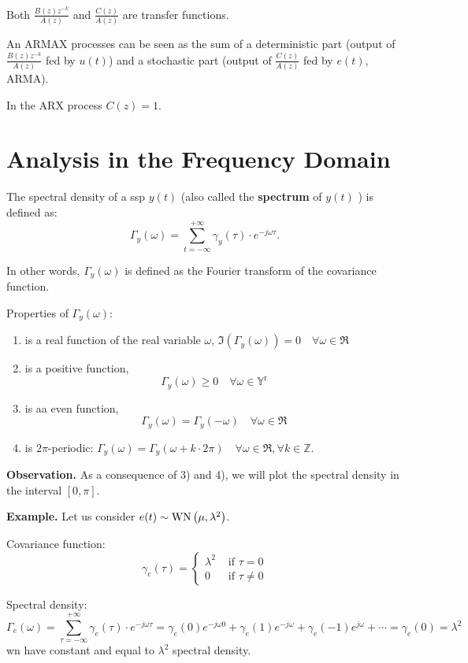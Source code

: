 Both $\frac{B(z) z^{-k}}{A(z)}$ and $\frac{C(z)}{A(z)}$ are transfer functions.

An ARMAX processes can be seen as the sum of a deterministic part (output of $\frac{B(z) z^{-k}}{A(z)}$ fed by $u(t)$) and a stochastic part (output of $\frac{C(z)}{A(z)}$ fed by $e(t)$, ARMA).

In the ARX process $C(z)=1$.

\section{Analysis in the Frequency Domain}
\begin{definition}
	The spectral density of a \gls{ssp} $y(t)$ (also called the \textbf{spectrum} of $y(t)$ ) is defined as:
	\[
		\Gamma_{y}(\omega)=\sum_{t=-\infty}^{+\infty} \gamma_{y}(\tau) \cdot e^{-j \omega \tau}.
	\]
\end{definition}

In other words, $\Gamma_y(\omega)$ is defined as the Fourier transform of the covariance function.

Properties of $\Gamma_{y}(\omega)$:
\begin{enumerate}
	\item is a real function of the real variable $\omega$, $\Im\left(\Gamma_{y}(\omega)\right)=0 \quad \forall \omega \in \Re$
	\item is a positive function,
	$$
		\Gamma_{y}(\omega) \geq 0 \quad \forall \omega \in \mathbb{Y}^{\mathrm{r}}
	$$
	\item is aa even function,
	$$
		\Gamma_{y}(\omega)=\Gamma_{y}(-\omega) \quad \forall \omega \in \Re
	$$
	\item is $2\pi$-periodic: $\Gamma_{y}(\omega)=\Gamma_{y}(\omega+k \cdot 2 \pi) \quad \forall \omega \in \Re, \forall k \in \mathbb{Z}$.
\end{enumerate}

\textbf{Observation.}
As a consequence of 3) and 4), we will plot the spectral density in the interval $[0, \pi]$.

\textbf{Example.}
Let us consider $e(t) \sim \operatorname{WN}\left(\mu, \lambda^{2}\right)$. 

Covariance function:
\[
	\gamma_{e}(\tau)= \begin{cases}\lambda^{2} & \text { if } \tau=0 \\ 0 & \text { if } \tau \neq 0\end{cases}
\]


Spectral density:
\[
	\Gamma_{e}(\omega) =\sum_{\tau=-\infty}^{+\infty} \gamma_{e}(\tau) \cdot e^{-j \omega \tau}=\gamma_{e}(0) e^{-j \omega 0}+\gamma_{e}(1) e^{-j \omega}+\gamma_{e}(-1) e^{j \omega}+\cdots=\gamma_{e}(0)=\lambda^{2}
\]
\gls{wn} have constant and equal to $\lambda^{2}$ spectral density.

